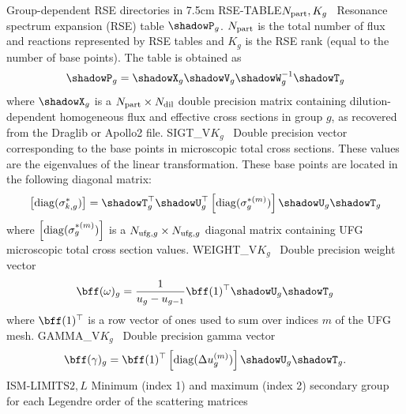 \vskip -0.4cm

\begin{DescriptionEnregistrement}{Group-dependent RSE directories in }{7.5cm}\label{table:rse}
\DbleEnr
  {RSE-TABLE}{$N_{\rm part}, K_g$}{~}
  {Resonance spectrum expansion (RSE) table $\shadowP_g$. $N_{\rm part}$ is the total number of flux and reactions
  represented by RSE tables and $K_g$ is the RSE rank (equal to the number of base points). The table is obtained as
  $$\shadowP_g=\shadowX_g \shadowV_g \shadowW_g^{-1} \shadowT_g$$
  \noindent where $\shadowX_g$ is a $N_{\rm part} \times N_{\rm dil}$ double precision matrix containing dilution-dependent
  homogeneous flux and effective cross sections in group $g$, as recovered from the Draglib or Apollo2 file.}
\DbleEnr
  {SIGT\_V}{$K_g$}{~}
  {Double precision vector corresponding to the base points in microscopic total cross sections. These
  values are the eigenvalues of the linear transformation. These base points are located in the following diagonal matrix:
  $$\left[{\rm diag}(\sigma^*_{k,g})\right]=\shadowT_g^\top \shadowU_g^\top \left[{\rm diag}(\sigma^{*(m)}_g)\right] \shadowU_g \shadowT_g$$
  \noindent where $\left[{\rm diag}(\sigma^{*(m)}_g)\right]$ is a $N_{{\rm ufg},g} \times N_{{\rm ufg},g}$ diagonal matrix containing UFG microscopic total cross section values.}
\DbleEnr
  {WEIGHT\_V}{$K_g$}{~}
  {Double precision weight vector $$\bff(\omega)_g={1\over{u_g-u_{g-1}}} \bff(1)^\top \shadowU_g \shadowT_g$$
  \noindent where $\bff(1)^\top$ is a row vector of ones used to sum over indices $m$ of the UFG mesh.}
\DbleEnr
  {GAMMA\_V}{$K_g$}{~}
  {Double precision gamma vector $$\bff(\gamma)_g=\bff(1)^\top \left[{\rm diag}(\Delta u_g^{(m)})\right] \shadowU_g \shadowT_g .$$}
\IntEnr
  {ISM-LIMITS}{$2,L$}
  {Minimum (index 1) and maximum (index 2) secondary group for each Legendre
   order of the scattering matrices}
\end{DescriptionEnregistrement}

\vskip -0.4cm

